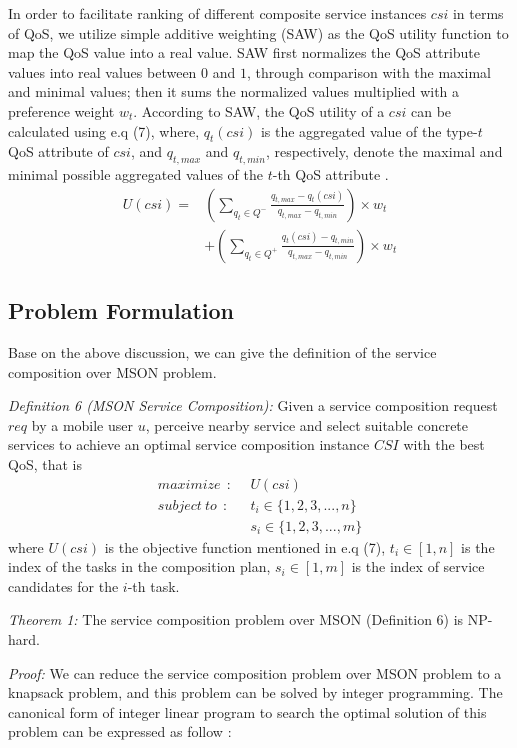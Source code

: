 \documentclass[10pt,journal,compsoc]{IEEEtran}
\begin{document}
In order to facilitate ranking of different composite service instances $csi$ in terms of QoS, we utilize simple additive weighting (SAW) as the QoS utility function to map the QoS value into a real value. SAW first normalizes the QoS attribute values into real values between $0$ and $1$, through comparison with the maximal and minimal values; then it sums the normalized values multiplied with a preference weight $w_t$. According to SAW, the QoS utility of a $csi$ can be calculated using e.q (7), where, $q_t(csi)$ is the aggregated value of the type-$t$ QoS attribute of $csi$, and $q_{t,max}$ and $q_{t,min}$, respectively, denote the maximal and minimal possible aggregated values of the $t$-th QoS attribute \cite{Wu2016}.
\begin{align}
U(csi) = & (\sum_{q_t \in Q^-} \frac{q_{t,max}-q_t(csi)}{q_{t,max}-q_{t,min}})\times w_t \\\nonumber
& +(\sum_{q_t \in Q^+} \frac{q_t(csi)-q_{t,min}}{q_{t,max}-q_{t,min}})\times w_t
\end{align}

\subsection{Problem Formulation}
Base on the above discussion, we can give the definition of the service composition over MSON problem.

\textit{Definition 6 (MSON Service Composition):} Given a service composition request $req$ by a mobile user $u$, perceive nearby service and select suitable concrete services to achieve an optimal service composition instance $CSI$ with the best QoS, that is
\begin{align}
maximize      \ \ : \ \ & U(csi)   \\\nonumber
subject\ to   \ \ : \ \ & t_i \in \{1,2,3,...,n\}  \\\nonumber
                        & s_i \in \{1,2,3,...,m \}
\end{align}
where $U(csi)$ is the objective function mentioned in e.q (7), $t_i \in [1,n]$ is the index of the tasks in the composition plan, $s_i \in [1, m]$ is the index of service candidates for the $i$-th task.

\textit{Theorem 1:} The service composition problem over MSON (Definition 6) is NP-hard.

\textit{Proof:} We can reduce the service composition problem over MSON problem to a knapsack problem, and this problem can be solved by integer programming. 
The canonical form of integer linear program to search the optimal solution of this problem can be expressed as follow \cite{papadimitriou1998combinatorial}:\
\end{document}
